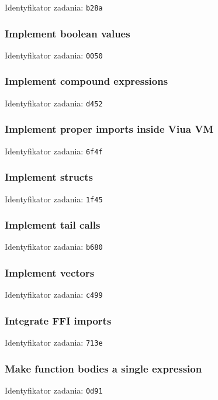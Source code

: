 Identyfikator zadania: \texttt{b28a}

\subsubsection{Implement boolean values}

Identyfikator zadania: \texttt{0050}

\subsubsection{Implement compound expressions}

Identyfikator zadania: \texttt{d452}

\subsubsection{Implement proper imports inside Viua VM}

Identyfikator zadania: \texttt{6f4f}

\subsubsection{Implement structs}

Identyfikator zadania: \texttt{1f45}

\subsubsection{Implement tail calls}

Identyfikator zadania: \texttt{b680}

\subsubsection{Implement vectors}

Identyfikator zadania: \texttt{c499}

\subsubsection{Integrate FFI imports}

Identyfikator zadania: \texttt{713e}

\subsubsection{Make function bodies a single expression}

Identyfikator zadania: \texttt{0d91}

